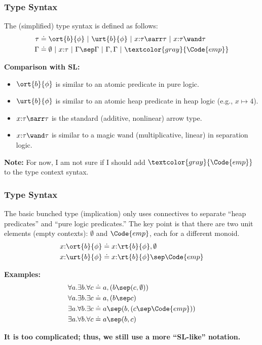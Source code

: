 \begin{frame}
\frametitle{Type Syntax}

The (simplified) type syntax is defined as follows:
\begin{align*}
\tau &\doteq \ort{b}{\phi} ~|~ \urt{b}{\phi} ~|~ x{:}\tau \sarr \tau ~|~ x{:}\tau \wand \tau \\
\Gamma &\doteq \emptyset ~|~ x{:}\tau ~|~ \Gamma \sep \Gamma ~|~ \Gamma, \Gamma ~|~ \textcolor{gray}{\Code{emp}}
\end{align*}

\textbf{Comparison with SL:} 

\begin{itemize}
    \item $\ort{b}{\phi}$ is similar to an atomic predicate in pure logic.
    \item $\urt{b}{\phi}$ is similar to an atomic heap predicate in heap logic (e.g., $x \mapsto 4$).
    \item $x{:}\tau \sarr \tau$ is the standard (additive, nonlinear) arrow type.
    \item $x{:}\tau \wand \tau$ is similar to a magic wand (multiplicative, linear) in separation logic.
\end{itemize}

\textbf{Note:} For now, I am not sure if I should add $\textcolor{gray}{\Code{emp}}$ to the type context syntax.

\end{frame}

\begin{frame}
    \frametitle{Type Syntax}
    
    The basic bunched type (implication) only uses connectives to separate ``heap predicates'' and ``pure logic predicates.'' The key point is that there are two unit elements (empty contexts): $\emptyset$ and $\Code{emp}$, each for a different monoid.
    \begin{align*}
    x{:}\ort{b}{\phi} &\doteq x{:}\rt{b}{\phi}, \emptyset \\
    x{:}\urt{b}{\phi} &\doteq x{:}\rt{b}{\phi} \sep \Code{emp}
    \end{align*}

    \textbf{Examples:}
    \begin{align*}
    \forall a.\exists b.\forall c &\doteq a, (b \sep (c, \emptyset)) \\
    \forall a.\exists b.\exists c &\doteq a, (b \sep c) \\
    \exists a.\forall b.\exists c &\doteq a \sep (b, (c \sep \Code{emp})) \\
    \exists a.\forall b.\forall c &\doteq a \sep (b, c)
    \end{align*}
    
    \textbf{It is too complicated; thus, we still use a more ``SL-like'' notation.} 
    
\end{frame}

